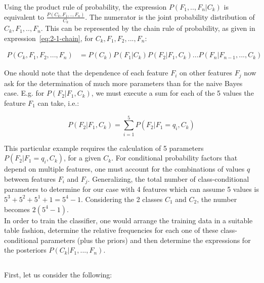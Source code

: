 \documentclass[paper=a4, fontsize=11pt]{scrartcl} %
\numberwithin{equation}{section} %
\numberwithin{figure}{section} %
\numberwithin{table}{section} %
\begin{document}
Using the product rule of probability, the expression 
$P(F_1, ..,F_n|C_k)$ is equivalent to $\frac{P(C_k,F_1, ..,F_n)}{C_k}$. 
The numerator is the joint probability distribution of $C_k, F_1, ..,F_n$. This 
can be represented by the chain rule of probability, as given in 
expression~\ref{eq:2-1-chain}, for $C_k, F_1, F_2, ..., F_n$:

\begin{equation}
\begin{split}
    P(C_k, F_1,F_2, ...,F_n) &= P(C_k)P(F_1|C_k)P(F_2|F_1,C_k) ... P(F_n|F_{n-1}, ..., C_k)
    \label{eq:2-1-chain}
\end{split}
\end{equation}

One should note that the dependence of each feature $F_i$ on other features 
$F_j$ now ask for the determination of much more parameters than for the 
naive Bayes case. E.g. for $P(F_2|F_1,C_k)$, we must execute a sum 
for each of the 5 values the feature $F_1$ can take, i.e.:

\[P(F_2|F_1,C_k) = \sum_{i=1}^{5} P(F_2|F_1 = q_i,C_k)\]

This particular example requires the calculation of 5 parameters 
$P(F_2|F_1 = q_i,C_k)$, for a given $C_k$. For conditional probability factors 
that depend on multiple features, one must account for the combinations of 
values $q$ between features $F_i$ and $F_j$. Generalizing, the total number of 
class-conditional parameters to determine for our case with 4 features which can assume 
5 values is $5^3 + 5^2 + 5^1 + 1 = 5^4 - 1$. Considering the 2 classes $C_1$ and 
$C_2$, the number becomes $2(5^4 - 1)$.\\

In order to train the classifier, one would arrange the 
training data in a suitable table fashion, determine the relative frequencies 
for each one of these class-conditional parameters (plus the priors) and then 
determine the expressions for the posteriors $P(C_k|F_1,...,F_n)$.\\

\subsection{}
\label{subsec:2-2}

First, let us consider the following:
\end{document}
